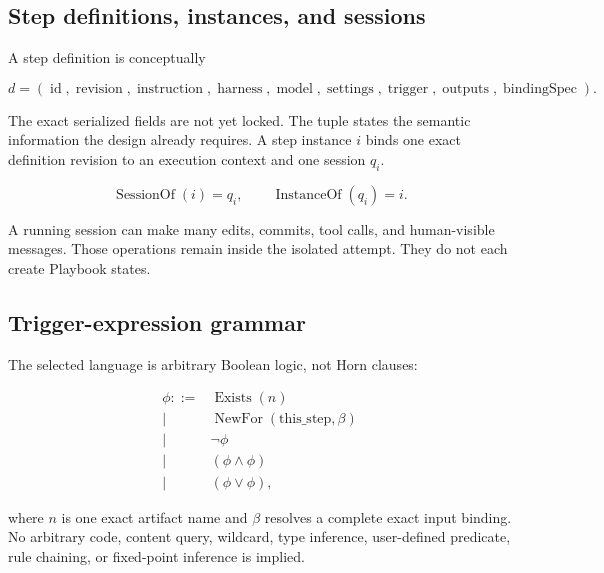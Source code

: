 \documentclass[11pt]{article}
\begin{document}
\subsection{Step definitions, instances, and sessions}

A step definition is conceptually

\begin{equation}
 d = (\operatorname{id},\operatorname{revision},\operatorname{instruction},
      \operatorname{harness},\operatorname{model},\operatorname{settings},
      \operatorname{trigger},\operatorname{outputs},\operatorname{bindingSpec}).
\end{equation}

The exact serialized fields are not yet locked. The tuple states the semantic information the design already requires. A step instance \(i\) binds one exact definition revision to an execution context and one session \(q_i\).

\begin{equation}
  \operatorname{SessionOf}(i)=q_i,\qquad
  \operatorname{InstanceOf}(q_i)=i.
\end{equation}

A running session can make many edits, commits, tool calls, and human-visible messages. Those operations remain inside the isolated attempt. They do not each create Playbook states.

\subsection{Trigger-expression grammar}

The selected language is arbitrary Boolean logic, not Horn clauses:

\begin{equation}
\begin{split}
 \phi ::= {} & \operatorname{Exists}(n) \\
        \mid & \operatorname{NewFor}(\mathrm{this\_step},\beta) \\
        \mid & \neg\phi \\
        \mid & (\phi\land\phi) \\
        \mid & (\phi\lor\phi),
\end{split}
\end{equation}

where \(n\) is one exact artifact name and \(\beta\) resolves a complete exact input binding. No arbitrary code, content query, wildcard, type inference, user-defined predicate, rule chaining, or fixed-point inference is implied.
\end{document}
